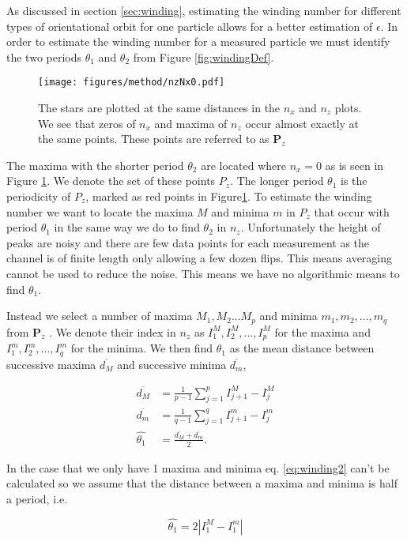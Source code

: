 	\label{sec:windingEstimation}
As discussed in section \ref{sec:winding}, estimating the winding number for different types of orientational orbit for one particle allows for a better estimation of $\epsilon$. In order to estimate the winding number for a measured 
particle we must identify the two periods $\theta_1$ and $\theta_2$ from Figure \ref{fig:windingDef}. 


\begin{figure}
\centering
\texttt{[image: figures/method/nzNx0.pdf]}
\caption{The stars are plotted at the same distances in the $n_x$ and $n_z$ plots. We see that zeros of $n_x$ and maxima of $n_z$ occur almost exactly at the same points. These points are referred to as $\mathbf{P}_z$}
\label{fig:nzNx0}
\end{figure}

The maxima with the shorter period $\theta_2$ are located where $n_x = 0$ as is seen in Figure \ref{fig:nzNx0}. We denote the set of these points $P_z$. The longer period $\theta_1$ is the periodicity of $P_z$, marked as red points in Figure\ref{fig:nzNx0}. To estimate the winding number we want to locate the maxima $M$ and minima $m$ in $P_z$ that occur with period $\theta_1$ in the same way we do to find $\theta_2$ in $n_z$. Unfortunately the height of peaks are noisy and there are few data points for each measurement as the channel is of finite length only allowing a few dozen flips. This means averaging cannot be used to reduce the noise. This means we have no algorithmic means to find $\theta_1$. 

Instead we select a number of maxima $M_1, M_2 ... M_p$ and minima $m_1, m_2, ..., m_q$ from $\mathbf{P}_z$ . We denote their index in $n_z$ as $I^M_1, I^M_2, 
..., I^M_p$ for the maxima and $I^m_1, I^m_2, ..., I^m_q$ for the minima. We then find $\theta_1$ as the mean distance between successive maxima $\overline{d_M}$ and successive minima $\overline{d_m}$, 

\begin{align}
\overline{d_M} &= \frac{1}{p-1} \sum\limits_{j=1}^{p} I^M_{j+1} - I^M_{j} \\
\overline{d_m} &= \frac{1}{q-1} \sum\limits_{j=1}^{q} I^m_{j+1}- I^m_{j}\\
\hat{\theta_1}   &= \frac{\overline{d_M} + \overline{d_m}}{2}.
\label{eq:winding2}
\end{align}

\noindent In the case that we only have 1 maxima and minima eq. \ref{eq:winding2} can't be calculated so we assume that the distance between a maxima and minima is half a period, i.e.

\begin{equation}
\hat{\theta_1} = 2\left| I^M_1 - I^m_1 \right|
\end{equation}